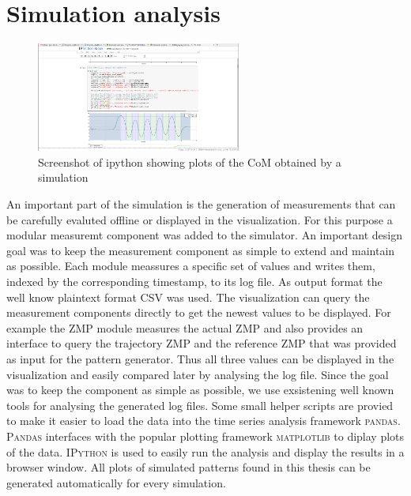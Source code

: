 \documentclass[english,ngerman]{KITreprt}
\newcommand{\name}[1]{\textsc{#1}}
\begin{document}
\section{Simulation analysis}\label{simulation-analysis}

\begin{figure}
  \begin{center}
     \includegraphics[width=0.6\textwidth]{images/plotting_screenshot.png}
  \end{center}
  \caption{Screenshot of ipython showing plots of the CoM obtained by a simulation}
\end{figure}

An important part of the simulation is the generation of measurements
that can be carefully evaluted offline or displayed in the
visualization. For this purpose a modular measuremt component was added
to the simulator. An important design goal was to keep the measurement
component as simple to extend and maintain as possible. Each module
meassures a specific set of values and writes them, indexed by the
corresponding timestamp, to its log file. As output format the well know
plaintext format CSV was used. The visualization can query the
measurement components directly to get the newest values to be
displayed. For example the ZMP module measures the actual ZMP and also
provides an interface to query the trajectory ZMP and the reference ZMP
that was provided as input for the pattern generator. Thus all three
values can be displayed in the visualization and easily compared later
by analysing the log file. Since the goal was to keep the component as
simple as possible, we use exsistening well known tools for analysing
the generated log files. Some small helper scripts are provied to make
it easier to load the data into the time series analysis framework
\name{pandas}. \name{Pandas} interfaces with the popular plotting
framework \name{matplotlib} to diplay plots of the data. \name{IPython}
is used to easily run the analysis and display the results in a browser
window. All plots of simulated patterns found in this thesis can be
generated automatically for every simulation.
\end{document}
